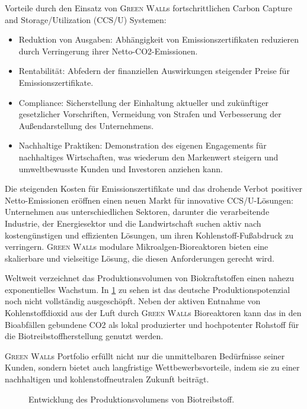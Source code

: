 Vorteile durch den Einsatz von \textsc{Green Wall}s fortschrittlichen Carbon Capture and Storage/Utilization (CCS/U) Systemen:

\begin{itemize}
    \item Reduktion von Ausgaben: Abhängigkeit von Emissionszertifikaten reduzieren durch Verringerung ihrer Netto-CO2-Emissionen.
    \item Rentabilität: Abfedern der finanziellen Auswirkungen steigender Preise für Emissionszertifikate.
    \item Compliance: Sicherstellung der Einhaltung aktueller und zukünftiger gesetzlicher Vorschriften, Vermeidung von Strafen und Verbesserung der Außendarstellung des Unternehmens.
    \item Nachhaltige Praktiken: Demonstration des eigenen Engagements für nachhaltiges Wirtschaften, was wiederum den Markenwert steigern und umweltbewusste Kunden und Investoren anziehen kann.
\end{itemize}

Die steigenden Kosten für Emissionszertifikate und das drohende Verbot positiver Netto-Emissionen eröffnen einen neuen Markt für innovative CCS/U-Lösungen: Unternehmen aus unterschiedlichen Sektoren, darunter die verarbeitende Industrie, der Energiesektor und die Landwirtschaft suchen aktiv nach kostengünstigen und effizienten Lösungen, um ihren Kohlenstoff-Fußabdruck zu verringern.
\textsc{Green Wall}s modulare Mikroalgen-Bioreaktoren bieten eine skalierbare und vielseitige Lösung, die diesen Anforderungen gerecht wird.\par\medskip

Weltweit verzeichnet das Produktionsvolumen von Biokraftstoffen einen nahezu exponentielles Wachstum.
In \cref{fig:biofuel production} zu sehen ist das deutsche Produktionspotenzial noch nicht vollständig ausgeschöpft.
Neben der aktiven Entnahme von Kohlenstoffdioxid aus der Luft durch \textsc{Green Wall}s Bioreaktoren kann das in den Bioabfällen gebundene CO2 als lokal produzierter und hochpotenter Rohstoff für die Biotreibstoffherstellung genutzt werden.

\textsc{Green Wall}s Portfolio erfüllt nicht nur die unmittelbaren Bedürfnisse seiner Kunden, sondern bietet auch langfristige Wettbewerbsvorteile, indem sie zu einer nachhaltigen und kohlenstoffneutralen Zukunft beiträgt.

\begin{figure}[h]
    \centering
    
    \caption[Entwicklung des Produktionsvolumens von Biotreibstoff]{Entwicklung des Produktionsvolumens von Biotreibstoff.}\label{fig:biofuel production}
\end{figure}